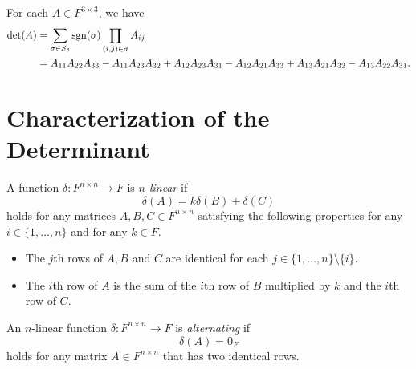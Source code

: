 \begin{example}
  For each $A \in F^{3 \times 3}$, we have
  \begin{align*}
    \det(A)
    &= \sum_{\sigma \in S_3} \operatorname{sgn}(\sigma) \prod_{(i, j) \in \sigma} A_{ij} \\
    &= A_{11}A_{22}A_{33} - A_{11}A_{23}A_{32} + A_{12}A_{23}A_{31}
    - A_{12}A_{21}A_{33} + A_{13}A_{21}A_{32} - A_{13}A_{22}A_{31}.
  \end{align*}
\end{example}

\section{Characterization of the Determinant}
\begin{definition}
  \label{def:multilinear}
  A function $\delta: F^{n \times n} \to F$ is \emph{$n$-linear} if
  \begin{equation*}
    \delta(A) = k\delta(B) + \delta(C)
  \end{equation*}
  holds for any matrices $A, B, C \in F^{n \times n}$ satisfying the following
  properties for any $i \in \{1, \dots, n\}$ and for any $k \in F$.
  \begin{itemize}
    \item The $j$th rows of $A, B$ and $C$ are identical for each
    $j \in \{1, \dots, n\} \setminus \{i\}$.
    \item The $i$th row of $A$ is the sum of the $i$th row of $B$ multiplied by
    $k$ and the $i$th row of $C$.
  \end{itemize}
\end{definition}

\begin{definition}
  An $n$-linear function $\delta: F^{n \times n} \to F$ is \emph{alternating}
  if
  \begin{equation*}
    \delta(A) = 0_F
  \end{equation*}
  holds for any matrix $A \in F^{n \times n}$ that has two identical rows.
\end{definition}

